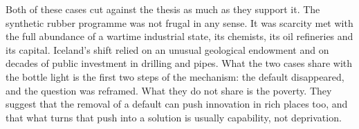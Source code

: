 \begin{counterpoint}
Both of these cases cut against the thesis as much as they support it. The
synthetic rubber programme was not frugal in any sense. It was scarcity met
with the full abundance of a wartime industrial state, its chemists, its oil
refineries and its capital. Iceland's shift relied on an unusual geological
endowment and on decades of public investment in drilling and pipes. What the
two cases share with the bottle light is the first two steps of the mechanism:
the default disappeared, and the question was reframed. What they do not share
is the poverty. They suggest that the removal of a default can push innovation
in rich places too, and that what turns that push into a solution is usually
capability, not deprivation.
\end{counterpoint}
